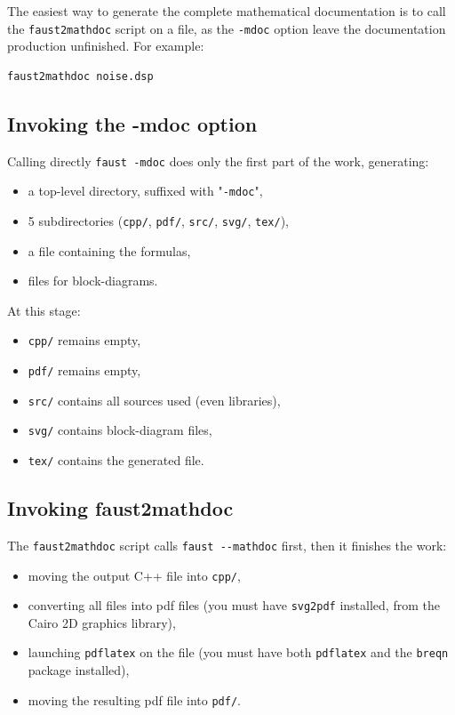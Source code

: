\documentclass[a4paper,10pt]{book}
\begin{document}
The easiest way to generate the complete mathematical documentation is to call the \lstinline!faust2mathdoc! script on a \faust file, as the \lstinline!-mdoc! option leave the documentation production unfinished. For example: 
\begin{lstlisting}
faust2mathdoc noise.dsp
\end{lstlisting}

\subsection{Invoking the -mdoc option}
\label{sec:invoking-mdoc}

Calling directly \lstinline!faust -mdoc! does only the first part of the work, generating:
\begin{itemize}
\item a top-level directory, suffixed with "\texttt{-mdoc}",
\item 5 subdirectories (\lstinline!cpp/!, \lstinline!pdf/!, \lstinline!src/!, \lstinline!svg/!, \lstinline!tex/!),
\item a \latex file containing the formulas,
\item \svg files for block-diagrams.
\end{itemize}

At this stage:
\begin{itemize}
\item \lstinline!cpp/! remains empty,
\item \lstinline!pdf/! remains empty,
\item \lstinline!src/! contains all \faust sources used (even libraries),
\item \lstinline!svg/! contains \svg block-diagram files,
\item \lstinline!tex/! contains the generated \latex file.
\end{itemize}

\subsection{Invoking faust2mathdoc}
\label{sec:invok-faust2m}

The \lstinline!faust2mathdoc! script calls \lstinline!faust --mathdoc! first, then it finishes the work:
\begin{itemize}
\item moving the output C++ file into \lstinline!cpp/!,
\item converting all \svg files into pdf files (you must have \lstinline!svg2pdf! installed, from the Cairo 2D graphics library),
\item launching \lstinline!pdflatex! on the \latex file (you must have both \lstinline!pdflatex! and the \lstinline!breqn! package installed),
\item moving the resulting pdf file into \lstinline!pdf/!.
\end{itemize}
\end{document}
